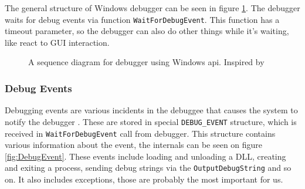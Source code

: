 The general structure of Windows debugger can be seen in figure
\ref{fig:win32debugger}. The debugger waits for debug events via function
\texttt{WaitForDebugEvent}. This function has a timeout parameter, so
the debugger can also do other things while it's waiting, like react to GUI
interaction.
\begin{figure}
    \centering
    \caption{A sequence diagram for debugger using Windows api. Inspired by }
    \label{fig:win32debugger}
\end{figure}

\subsubsection*{Debug Events}\label{section:Debug Events}
Debugging events are various incidents in the debuggee that causes the system
to notify the debugger \cite{windows-msdn-debug-events}. These are stored in
special \texttt{DEBUG_EVENT} structure, which is received in
\texttt{WaitForDebugEvent} call from debugger. This structure contains various
information about the event, the internals can be seen on figure
\ref{fig:DebugEvent}. These events include loading and unloading a DLL,
creating and exiting a process, sending debug strings via the
\texttt{OutputDebugString} and so on. It also includes exceptions, those
are probably the most important for us. 


